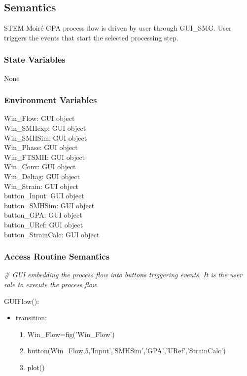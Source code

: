 \documentclass[12pt, titlepage]{article}
\newcommand{\progname}{STEM Moir{\'e} GPA}
\begin{document}
\subsection{Semantics}

\progname{} process flow is driven by user through GUI{\_}SMG. User triggers the 
events that start the selected processing step. 

\subsubsection{State Variables}
None

\subsubsection{Environment Variables}

\noindent Win{\_}Flow: GUI object\\
Win{\_}SMHexp: GUI object\\
Win{\_}SMHSim: GUI object\\
Win{\_}Phase: GUI object\\
Win{\_}FTSMH: GUI object\\
Win{\_}Conv: GUI object\\
Win{\_}Deltag: GUI object\\
Win{\_}Strain: GUI object\\
button{\_}Input: GUI object\\
button{\_}SMHSim: GUI object\\
button{\_}GPA: GUI object\\
button{\_}URef: GUI object\\
button{\_}StrainCalc: GUI object\\


\subsubsection{Access Routine Semantics}

\noindent\textit{{\#} GUI embedding the process flow into buttons triggering 
events. It is the user role to execute the process flow.}\medskip

\noindent GUIFlow():
\begin{itemize}
\item transition: 
	\begin{enumerate}
	\item Win{\_}Flow=fig('Win{\_}Flow') 
	\item button(Win{\_}Flow,5,'Input','SMHSim','GPA','URef','StrainCalc') 
	\item plot()
	\end{enumerate} 
\end{itemize}
\bigskip
\end{document}
